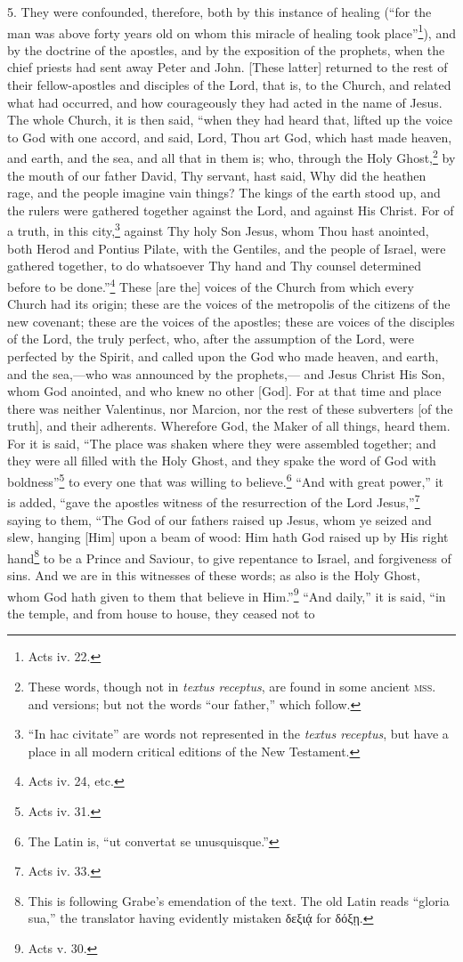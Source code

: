 5. They were confounded, therefore, both by this instance of healing (“for the man was above forty years old on whom this miracle of healing took place”\footnote{Acts iv. 22.}), and by the doctrine of the apostles, and by the exposition of the prophets, when the chief priests had sent away Peter and John. [These latter] returned to the rest of their fellow-apostles and disciples of the Lord, that is, to the Church, and related what had occurred, and how courageously they had acted in the name of Jesus. The whole Church, it is then said, “when they had heard that, lifted up the voice to God with one accord, and said, Lord, Thou art God, which hast made heaven, and earth, and the sea, and all that in them is; who, through the Holy Ghost,\footnote{These words, though not in \emph{textus receptus}, are found in some ancient \textsc{mss.} and versions; but not the words “our father,” which follow.} by the mouth of our father David, Thy servant, hast said, Why did the heathen rage, and the people imagine vain things? The kings of the earth stood up, and the rulers were gathered together against the Lord, and against His Christ. For of a truth, in this city,\footnote{“In hac civitate” are words not represented in the \emph{textus receptus}, but have a place in all modern critical editions of the New Testament.} against Thy holy Son Jesus, whom Thou hast anointed, both Herod and Pontius Pilate, with the Gentiles, and the people of Israel, were gathered together, to do whatsoever Thy hand and Thy counsel determined before to be done.”\footnote{Acts iv. 24, etc.} These [are the] voices of the Church from which every Church had its origin; these are the voices of the metropolis of the citizens of the new covenant; these are the voices of the apostles; these are voices of the disciples of the Lord, the truly perfect, who, after the assumption of the Lord, were perfected by the Spirit, and called upon the God who made heaven, and earth, and the sea,—who was announced by the prophets,— and Jesus Christ His Son, whom God anointed, and who knew no other [God]. For at that time and place there was neither Valentinus, nor Marcion, nor the rest of these subverters [of the truth], and their adherents. Wherefore God, the Maker of all things, heard them. For it is said, “The place was shaken where they were assembled together; and they were all filled with the Holy Ghost, and they spake the word of God with boldness”\footnote{Acts iv. 31.} to every one that was willing to believe.\footnote{The Latin is, “ut convertat se unusquisque.”} “And with great power,” it is added, “gave the apostles witness of the resurrection of the Lord Jesus,”\footnote{Acts iv. 33.} saying to them, “The God of our fathers raised up Jesus, whom ye seized and slew, hanging [Him] upon a beam of wood: Him hath God raised up by His right hand\footnote{This is following Grabe’s emendation of the text. The old Latin reads “gloria sua,” the translator having evidently mistaken\textgreek{ δεξιᾴ} for \textgreek{δόξῃ}.} to be a Prince and Saviour, to give repentance to Israel, and  forgiveness of sins. And we are in this witnesses of these words; as also is the Holy Ghost, whom God hath given to them that believe in Him.”\footnote{Acts v. 30.} “And daily,” it is said, “in the temple, and from house to house, they ceased not to 